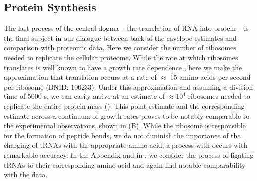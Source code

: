 \subsection{Protein Synthesis}
The last process of the central dogma -- the translation of RNA into 
protein -- is the final subject in our dialogue between back-of-the-envelope
estimates and comparison with proteomic data.
Here we consider the number of ribosomes needed to replicate the cellular
proteome.  While the rate at which ribosomes translates is well known to have a
growth rate dependence \cite{dai2018}, here we make the approximation that
translation occurs at a rate of $\approx$ 15 amino acids per second per ribosome
(BNID: 100233). Under this approximation and assuming a division time of 5000 s,
we can easily arrive at an estimate of $\approx 10^4$ ribosomes needed to
replicate the entire protein mass (). This point estimate
and the corresponding estimate across a continuum of growth rates proves to be
notably comparable to the experimental observations, shown in
(B). While the ribosome is responsible for the formation
of peptide bonds, we do not diminish the importance of the charging of tRNAs
with the appropriate amino acid, a process with occurs with remarkable accuracy.
In the Appendix and in , we consider the
process of ligating tRNAs to their corresponding amino acid and again find
notable comparability with the data.






